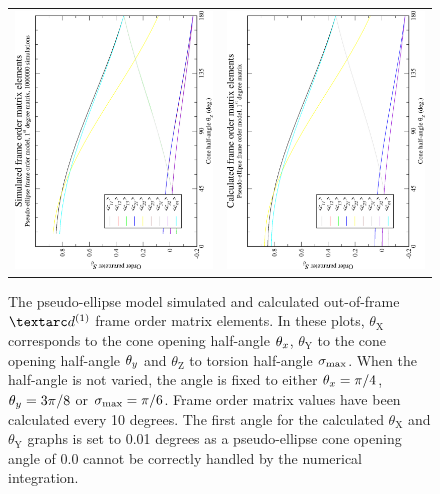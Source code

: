 \begin{figure}
\begin{tabular}{@{}cc@{}}
    \\[-5pt]
    \includegraphics[width=.35\textwidth,angle=270]{images/frame_order_matrix/Sij_pseudo-ellipse_out_of_frame_theta_z_ens1000000.eps} &
    \includegraphics[width=.35\textwidth,angle=270]{images/frame_order_matrix/Sij_pseudo-ellipse_out_of_frame_theta_z_calc.eps} \\
  \end{tabular}
  \caption[Pseudo-ellipse simulated and calculated out-of-frame Daeg$^{(1)}$ elements.]{
    The pseudo-ellipse model simulated and calculated out-of-frame $\FOone$ frame order matrix elements.
    In these plots, $\theta_\textrm{X}$ corresponds to the cone opening half-angle $\theta_x$, $\theta_\textrm{Y}$ to the cone opening half-angle $\theta_y$ and $\theta_\textrm{Z}$ to torsion half-angle $\sigma_\textrm{max}$.
    When the half-angle is not varied, the angle is fixed to either $\theta_x = \pi/4$, $\theta_y = 3\pi/8$ or $\sigma_\textrm{max} = \pi/6$.
    Frame order matrix values have been calculated every 10 degrees.
    The first angle for the calculated $\theta_\textrm{X}$ and $\theta_\textrm{Y}$ graphs is set to 0.01 degrees as a pseudo-ellipse cone opening angle of 0.0 cannot be correctly handled by the numerical integration.
  }
  \label{fig: simulated and calculated out-of-frame 1st degree pseudo-ellipse frame order}
\end{figure}

